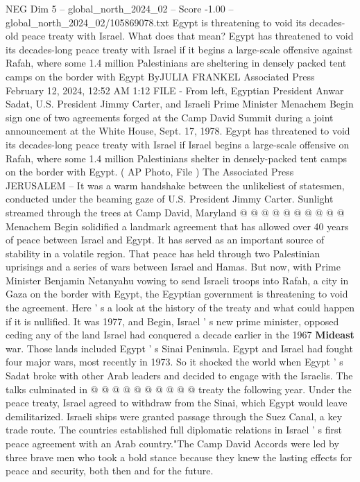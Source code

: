 \begin{textsample}{NEG Dim 5 – global\_north\_2024\_02 – Score -1.00 – global\_north\_2024\_02/105869078.txt}  \label{ex:f5_neg_213}
Egypt is threatening to void its decades-old peace treaty with Israel.
What does that mean?
Egypt has threatened to void its decades-long peace treaty with Israel if it begins a large-scale offensive against Rafah, where some 1.4 million Palestinians are sheltering in densely packed tent camps on the border with Egypt ByJULIA FRANKEL Associated Press February 12, 2024, 12:52 AM 1:12 FILE - From left, Egyptian President Anwar Sadat, U.S.
President Jimmy Carter, and Israeli Prime Minister Menachem Begin sign one of two agreements forged at the Camp David Summit during a joint announcement at the White House, Sept. 17, 1978.
Egypt has threatened to void its decades-long peace treaty with Israel if Israel begins a large-scale offensive on Rafah, where some 1.4 million Palestinians shelter in densely-packed tent camps on the border with Egypt. ( AP Photo, File ) The Associated Press JERUSALEM -- It was a warm handshake between the unlikeliest of statesmen, conducted under the beaming gaze of U.S.
President Jimmy Carter.
Sunlight streamed through the trees at Camp David, Maryland @ @ @ @ @ @ @ @ @ @ Menachem Begin solidified a landmark agreement that has allowed over 40 years of peace between Israel and Egypt.
It has served as an important source of stability in a volatile region.
That peace has held through two Palestinian uprisings and a series of wars between Israel and Hamas.
But now, with Prime Minister Benjamin Netanyahu vowing to send Israeli troops into Rafah, a city in Gaza on the border with Egypt, the Egyptian government is threatening to void the agreement.
Here ' s a look at the history of the treaty and what could happen if it is nullified.
It was 1977, and Begin, Israel ' s new prime minister, opposed ceding any of the land Israel had conquered a decade earlier in the 1967 \textbf{Mideast} war.
Those lands included Egypt ' s Sinai Peninsula.
Egypt and Israel had fought four major wars, most recently in 1973.
So it shocked the world when Egypt ' s Sadat broke with other Arab leaders and decided to engage with the Israelis.
The talks culminated in @ @ @ @ @ @ @ @ @ @ treaty the following year.
Under the peace treaty, Israel agreed to withdraw from the Sinai, which Egypt would leave demilitarized.
Israeli ships were granted passage through the Suez Canal, a key trade route.
The countries established full diplomatic relations in Israel ' s first peace agreement with an Arab country."The Camp David Accords were led by three brave men who took a bold stance because they knew the lasting effects for peace and security, both then and for the future.

\end{textsample}
